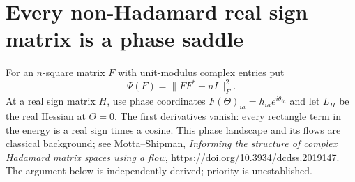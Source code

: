 \section{Every non-Hadamard real sign matrix is a phase saddle}
For an $n$-square matrix $F$ with unit-modulus complex entries put
\[
 \Psi(F)=\|FF^*-nI\|_F^2.
\]
At a real sign matrix $H$, use phase coordinates
$F(\Theta)_{ia}=h_{ia}e^{i\theta_{ia}}$ and let $L_H$ be the real
Hessian at $\Theta=0$. The first derivatives vanish: every rectangle
term in the energy is a real sign times a cosine.
This phase landscape and its flows are classical background;
see Motta--Shipman, \emph{Informing the structure of complex Hadamard
matrix spaces using a flow},
\url{https://doi.org/10.3934/dcdss.2019147}.
The argument below is independently derived; priority is unestablished.

